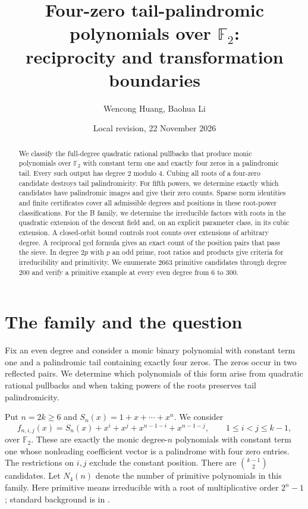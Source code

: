 \documentclass[11pt]{article}
\title{\Large Four-zero tail-palindromic polynomials over $\mathbb F_2$:\\
reciprocity and transformation boundaries}
\author{Wencong Huang, Baohua Li}
\date{Local revision, 22 November 2026}
\theoremstyle{definition}
\theoremstyle{remark}
\begin{document}
\maketitle
\begin{abstract}
We classify the full-degree quadratic rational pullbacks that produce
monic polynomials over $\mathbb F_2$ with constant term one and exactly
four zeros in a palindromic tail. Every such output has degree $2$
modulo $4$. Cubing all roots of a four-zero candidate destroys tail
palindromicity. For fifth powers, we determine exactly which candidates
have palindromic images and give their zero counts. Sparse norm
identities and finite certificates cover all admissible degrees and
positions in these root-power classifications. For the B family, we
determine the irreducible factors with roots in the quadratic extension
of the descent field and, on an explicit parameter class, in its cubic
extension. A closed-orbit bound controls root counts over extensions
of arbitrary degree. A reciprocal gcd formula gives an exact count
of the position pairs that pass the sieve. In degree $2p$ with $p$ an odd
prime, root ratios and products give criteria for irreducibility and
primitivity. We enumerate $2663$ primitive candidates through degree
$200$ and verify a primitive example at every even degree from $6$
to $300$.
\end{abstract}

\section{The family and the question}\label{sec:intro}
Fix an even degree and consider a monic binary polynomial with
constant term one and a palindromic tail containing exactly four zeros.
The zeros occur in two reflected pairs. We determine which polynomials
of this form arise from quadratic rational pullbacks and when taking
powers of the roots preserves tail palindromicity.

Put $n=2k\ge6$ and $S_n(x)=1+x+\cdots+x^n$. We consider
\begin{equation}\label{eq:candidate}
 f_{n,i,j}(x)=S_n(x)+x^i+x^j+x^{n-1-i}+x^{n-1-j},
 \qquad 1\le i<j\le k-1,
\end{equation}
over $\mathbb F_2$. These are exactly the monic degree-$n$ polynomials
with constant term one whose nonleading coefficient vector is a
palindrome with four zero entries. The restrictions on $i,j$ exclude
the constant position. There are $\binom{k-1}{2}$ candidates.
Let $N_4(n)$ denote the number of primitive polynomials in this family.
Here primitive means irreducible with a root of multiplicative order
$2^n-1$; standard background is in \cite{LN}.
\end{document}
